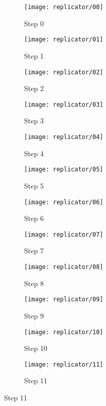 \begin{figure}[!ht]
    \centering
    \begin{subfigure}{0.32\textwidth}
        \centering
        \texttt{[image: replicator/00]}
        \caption{Step 0}
    \end{subfigure}
    \begin{subfigure}{0.32\textwidth}
        \centering
        \texttt{[image: replicator/01]}
        \caption{Step 1}
    \end{subfigure}
    \begin{subfigure}{0.32\textwidth}
        \centering
        \texttt{[image: replicator/02]}
        \caption{Step 2}
    \end{subfigure}
    \par\bigskip
    \begin{subfigure}{0.32\textwidth}
        \centering
        \texttt{[image: replicator/03]}
        \caption{Step 3}
    \end{subfigure}
    \begin{subfigure}{0.32\textwidth}
        \centering
        \texttt{[image: replicator/04]}
        \caption{Step 4}
    \end{subfigure}
    \begin{subfigure}{0.32\textwidth}
        \centering
        \texttt{[image: replicator/05]}
        \caption{Step 5}
    \end{subfigure}
    \par\bigskip
    \begin{subfigure}{0.32\textwidth}
        \centering
        \texttt{[image: replicator/06]}
        \caption{Step 6}
    \end{subfigure}
    \begin{subfigure}{0.32\textwidth}
        \centering
        \texttt{[image: replicator/07]}
        \caption{Step 7}
    \end{subfigure}
    \begin{subfigure}{0.32\textwidth}
        \centering
        \texttt{[image: replicator/08]}
        \caption{Step 8}
    \end{subfigure}
    \par\bigskip
    \begin{subfigure}{0.32\textwidth}
        \centering
        \texttt{[image: replicator/09]}
        \caption{Step 9}
    \end{subfigure}
    \begin{subfigure}{0.32\textwidth}
        \centering
        \texttt{[image: replicator/10]}
        \caption{Step 10}
    \end{subfigure}
    \begin{subfigure}{0.32\textwidth}
        \centering
        \texttt{[image: replicator/11]}
        \caption{Step 11}
    \end{subfigure}
\end{figure}

